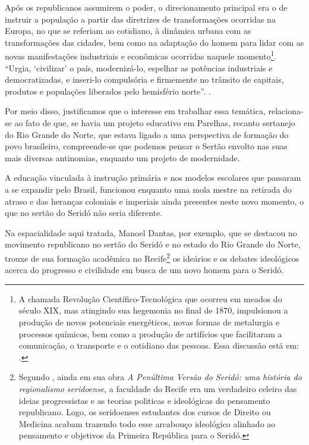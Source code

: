 \begin{refsection}
Após os republicanos assumirem o poder, o direcionamento principal era o de instruir a população a partir das diretrizes de transformações ocorridas na Europa, no que se referiam ao cotidiano, à dinâmica urbana com as transformações das cidades, bem como na adaptação do homem para lidar com as novas manifestações industriais e econômicas ocorridas naquele momento\footnote{A chamada Revolução Científico-Tecnológica que ocorreu em meados do século XIX, mas atingindo sua hegemonia no final de 1870, impulsionou a produção de novos potenciais energéticos, novas formas de metalurgia e processos químicos, bem como a produção de artifícios que facilitaram a comunicação, o transporte e o cotidiano das pessoas. Essa discussão está em: .}. ``Urgia, `civilizar' o país, modernizá-lo, espelhar as potências industriais e democratizadas, e inseri-lo compulsória e firmemente no trânsito de capitais, produtos e populações liberados pelo hemisfério norte''. \cite[p.~134]{Marins1998Habitacao}.

Por meio disso, justificamos que o interesse em trabalhar essa temática, relaciona-se ao fato de que, se havia um projeto educativo em Parelhas, recanto sertanejo do Rio Grande do Norte, que estava ligado a uma perspectiva de formação do povo brasileiro, compreende-se que podemos pensar o Sertão envolto nas suas mais diversas antinomias, enquanto um projeto de modernidade.  

A educação vinculada à instrução primária e nos modelos escolares que passaram a se expandir pelo Brasil, funcionou enquanto uma mola mestre na retirada do atraso e das heranças coloniais e imperiais ainda presentes neste novo momento, o que no sertão do Seridó não seria diferente.  

Na espacialidade aqui tratada, Manoel Dantas, por exemplo, que se destacou no movimento republicano no sertão do Seridó e no estado do Rio Grande do Norte, trouxe de sua formação acadêmica no Recife\footnote{Segundo \textcite{Macedo2005}, ainda em sua obra \textit{A Penúltima Versão do Seridó: uma história do regionalismo seridoense}, a faculdade do Recife era um verdadeiro celeiro das ideias progressistas e as teorias politicas e ideológicas do pensamento republicano. Logo, os seridoenses estudantes dos cursos de Direito ou Medicina acabam trazendo todo esse arcabouço ideológico alinhado ao pensamento e objetivos da Primeira República para o Seridó.} os ideários e os debates ideológicos acerca do progresso e civilidade em busca de um novo homem para o Seridó.


\end{refsection}
